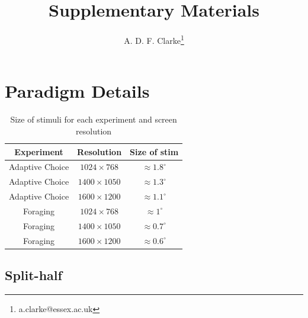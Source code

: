 \documentclass[a4paper, oneside, 11pt, onecolumn]{article}
\begin{document}
\title{Supplementary Materials}

\author{A. D. F. Clarke\thanks{a.clarke@essex.ac.uk}}

\maketitle

\begin{abstract}

\end{abstract}

\section{Paradigm Details}


\begin{table}
	\centering
	\small
	\begin{tabular}{cc|c}
	    Experiment	    &	Resolution	     & Size of stim \\
		\hline
		Adaptive Choice & $1024 \times 768$  & $\approx$$1.8^{\circ}$ \\
		Adaptive Choice & $1400 \times 1050$ & $\approx$$1.3^{\circ}$ \\
		Adaptive Choice & $1600 \times 1200$ & $\approx$$1.1^{\circ}$ \\
		Foraging        & $1024 \times 768$  & $\approx$$1^{\circ}$ \\
		Foraging        & $1400 \times 1050$ & $\approx$$0.7^{\circ}$ \\
		Foraging        & $1600 \times 1200$ & $\approx$$0.6^{\circ}$ \\
	\end{tabular}
	\caption{Size of stimuli for each experiment and screen resolution}
	\label{tab:Screen_Res}
\end{table}

\subsection{Split-half}
\end{document}
